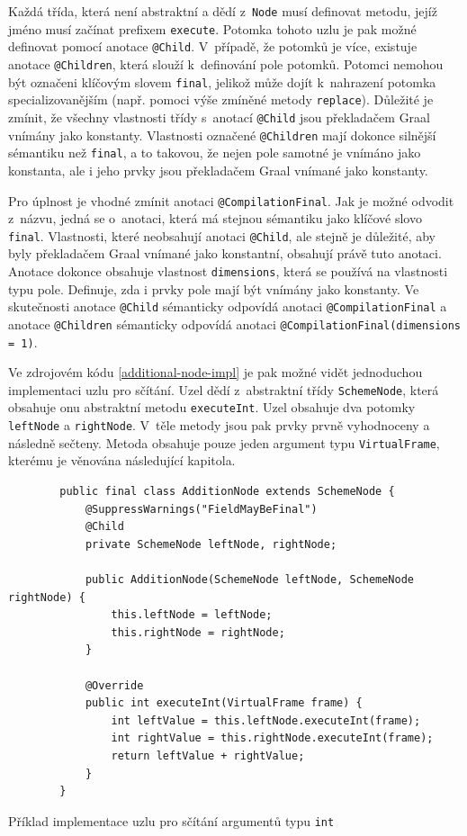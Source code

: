 \documentclass[
  master,
  biblatex,
  figures=true,
  theorems,
  sourcecodes,
  glossaries,
  index
]{kidiplom}
\begin{document}
Každá třída, která není abstraktní a dědí z~\texttt{Node} musí definovat metodu, jejíž jméno musí začínat prefixem \texttt{execute}. Potomka tohoto uzlu je pak možné definovat pomocí anotace \texttt{@Child}. V~případě, že potomků je více, existuje anotace \texttt{@Children}, která slouží k~definování pole potomků. Potomci nemohou být označeni klíčovým slovem \texttt{final}, jelikož může dojít k~nahrazení potomka specializovanějším (např. pomoci výše zmíněné metody \texttt{replace}). Důležité je zmínit, že všechny vlastnosti třídy s~anotací \texttt{@Child} jsou překladačem Graal vnímány jako konstanty. Vlastnosti označené \texttt{@Children} mají dokonce silnější sémantiku než \texttt{final}, a to takovou, že nejen pole samotné je vnímáno jako konstanta, ale i jeho prvky jsou překladačem Graal vnímané jako konstanty.  

Pro úplnost je vhodné zmínit anotaci \texttt{@CompilationFinal}. Jak je možné odvodit z~názvu, jedná se o~anotaci, která má stejnou sémantiku jako klíčové slovo \texttt{final}. Vlastnosti, které neobsahují anotaci \texttt{@Child}, ale stejně je důležité, aby byly překladačem Graal vnímané jako konstantní, obsahují právě tuto anotaci. Anotace dokonce obsahuje vlastnost \texttt{dimensions}, která se používá na vlastnosti typu pole. Definuje, zda i prvky pole mají být vnímány jako konstanty. Ve skutečnosti anotace \texttt{@Child} sémanticky odpovídá anotaci \texttt{@CompilationFinal} a anotace \texttt{@Children} sémanticky odpovídá anotaci \texttt{@CompilationFinal(dimensions = 1)}. 

Ve zdrojovém kódu \ref{additional-node-impl} je pak možné vidět jednoduchou implementaci uzlu pro sčítání. Uzel dědí z~abstraktní třídy \texttt{SchemeNode}, která obsahuje onu abstraktní metodu \texttt{executeInt}. Uzel obsahuje dva potomky \texttt{leftNode} a \texttt{rightNode}. V~těle metody jsou pak prvky prvně vyhodnoceny a následně sečteny. Metoda obsahuje pouze jeden argument typu \texttt{VirtualFrame}, kterému je věnována následující kapitola.


\begin{listing} [H]
    \begin{verbatim}
        public final class AdditionNode extends SchemeNode {
            @SuppressWarnings("FieldMayBeFinal")
            @Child
            private SchemeNode leftNode, rightNode;
        
            public AdditionNode(SchemeNode leftNode, SchemeNode rightNode) {
                this.leftNode = leftNode;
                this.rightNode = rightNode;
            }
        
            @Override
            public int executeInt(VirtualFrame frame) {
                int leftValue = this.leftNode.executeInt(frame);
                int rightValue = this.rightNode.executeInt(frame);
                return leftValue + rightValue;
            }
        }
    \end{verbatim}
    \caption{Příklad implementace uzlu pro sčítání argumentů typu \texttt{int}}
    \label{additional-node-impl}
\end{listing}
\end{document}
